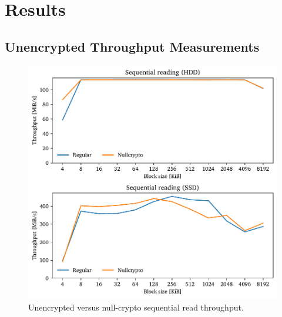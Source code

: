 
\section{Results}
\label{chap:performance.results}

\subsection{Unencrypted Throughput Measurements}
\label{chap:performance.results.unencrypted}
\begin{figure}[htb!]
	\center
	\includegraphics[scale=1]{../fig/performance.results.nullcryptoseq.pdf}
	\caption[
		Unencrypted versus null-crypto sequential read throughput
	]{
		Unencrypted versus null-crypto sequential read throughput. 
	}
	\label{fig:performance.results.nullcryptoseq}
\end{figure}

